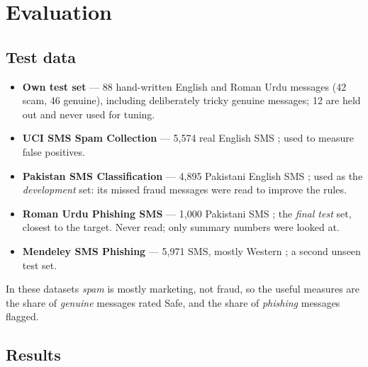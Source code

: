 \documentclass[11pt,a4paper]{article}
\begin{document}
\section{Evaluation}

\subsection{Test data}
\begin{itemize}
  \item \textbf{Own test set} --- 88 hand-written English and Roman Urdu messages (42 scam, 46 genuine),
        including deliberately tricky genuine messages; 12 are held out and never used for tuning.
  \item \textbf{UCI SMS Spam Collection} --- 5{,}574 real English SMS \cite{uci}; used to measure false positives.
  \item \textbf{Pakistan SMS Classification} --- 4{,}895 Pakistani English SMS \cite{pksms}; used as the
        \emph{development} set: its missed fraud messages were read to improve the rules.
  \item \textbf{Roman Urdu Phishing SMS} --- 1{,}000 Pakistani SMS \cite{zenodo}; the \emph{final test}
        set, closest to the target. Never read; only summary numbers were looked at.
  \item \textbf{Mendeley SMS Phishing} --- 5{,}971 SMS, mostly Western \cite{mendeley}; a second unseen test set.
\end{itemize}
In these datasets \emph{spam} is mostly marketing, not fraud, so the useful measures are the share of
\emph{genuine} messages rated Safe, and the share of \emph{phishing} messages flagged.

\subsection{Results}
\end{document}
